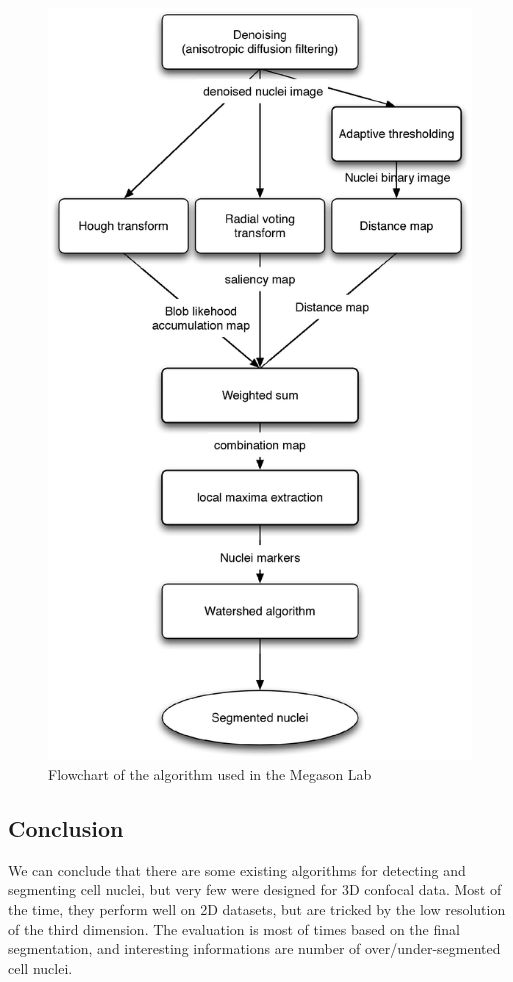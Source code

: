 \begin{figure}[h]
\begin{center}
\leavevmode
\includegraphics[height=0.87\textheight]{pictures/kishoreFlowchart}
\end{center}
\caption{Flowchart of the algorithm used in the Megason Lab}
\label{fig:kishoreFlowchart}
\end{figure}
\clearpage


\subsection*{Conclusion}

We can conclude that there are some existing algorithms for detecting and segmenting cell nuclei,
but very few were designed for 3D confocal data.
Most of the time, they perform well on 2D datasets, but are tricked by the low resolution of the third dimension.
The evaluation is most of times based on the final segmentation, and interesting informations are number of over/under-segmented cell nuclei.



